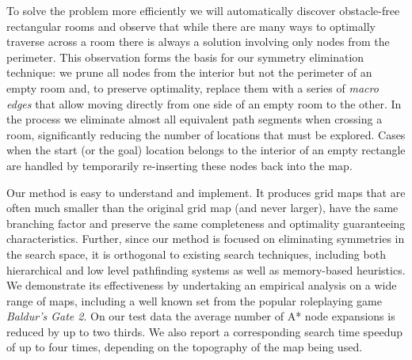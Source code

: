 To solve the problem more efficiently we will automatically discover obstacle-free rectangular rooms and 
observe that while there are many ways to optimally traverse across a room there is always a solution 
involving only nodes from the perimeter.
This observation forms the basis for our symmetry elimination technique: we prune all nodes from the interior
but not the perimeter of an empty room and, to preserve optimality,
replace them with a series of \emph{macro edges} that allow
moving directly from one side of an empty room to the other. 
In the process we eliminate almost all equivalent path segments when crossing a room,
significantly reducing the number of locations that must be explored.
Cases when the start (or the goal) location belongs to the interior of an empty rectangle are handled by
temporarily re-inserting these nodes back into the map.
\par
Our method is easy to understand and implement.
It produces grid maps that are often much smaller than the original grid map
(and never larger), have the same branching factor and preserve the same completeness and optimality 
guaranteeing characteristics.
Further, since our method is focused on eliminating symmetries in the search space, it is orthogonal to existing 
search techniques, including both hierarchical and low level pathfinding systems as well as memory-based heuristics.
We demonstrate its effectiveness by undertaking an empirical analysis on a wide range of maps, 
including a well known set from the popular roleplaying game \emph{Baldur's Gate 2}. 
On our test data the average number of A* node expansions is reduced by up to two thirds.
We also report a corresponding search time speedup of up to four times, depending on the 
topography of the map being used.




